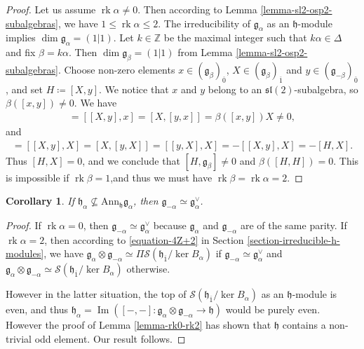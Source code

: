 \documentclass[12pt, a4paper, reqno]{amsart}
\def\g{\mathfrak{g}}
\def\h{\mathfrak{h}}
\def\l{\mathfrak{l}}
\def\s{\mathfrak{s}}
\def\ol{\overline}
\def\rk{\operatorname{rk}}
\newtheorem{corollary}{Corollary}
\theoremstyle{definition}
\theoremstyle{definition}
\theoremstyle{definition}
\numberwithin{theorem}{section}
\numberwithin{lemma}{section}
\numberwithin{remark}{section}
\numberwithin{definition}{section}
\numberwithin{corollary}{section}
\numberwithin{proposition}{section}
\numberwithin{example}{section}
\begin{document}
	\begin{proof}
		Let us assume \(\rk\alpha \neq 0\). Then according to Lemma \ref{lemma-sl2-osp2-subalgebras}, we have \(1 \leq \rk\alpha \leq 2\). The irreducibility of \(\mathfrak{g}_{\alpha}\) as an \(\mathfrak{h}\)-module implies \(\dim \mathfrak{g}_{\alpha} = (1|1)\). Let \(k \in \mathbb{Z}\) be the maximal integer such that \(k\alpha \in \Delta\) and fix \(\beta = k\alpha\). Then \(\dim \mathfrak{g}_\beta = (1|1)\) from Lemma \ref{lemma-sl2-osp2-subalgebras}. Choose non-zero elements \(x \in (\mathfrak{g}_{\beta})_{\ol{0}}\), \(X \in (\mathfrak{g}_{\beta})_{\ol{1}}\) and \(y \in (\mathfrak{g}_{-\beta})_{\ol{0}}\), and set \(H \coloneq [X,y]\). We notice that \(x\) and \(y\) belong to an \(\s\l(2)\)-subalgebra, so \(\beta([x,y]) \neq 0\). We have
		\begin{align*}
			[H,x] = [[X,y],x] = [X,[y,x]] = \beta([x,y])X \neq 0,
		\end{align*}
		and
		\begin{align*}
			[H,X] = [[X,y],X] = [X,[y,X]] = [[y,X],X] = -[[X,y],X] = -[H,X].
		\end{align*}
		Thus \([H,X] = 0\), and we conclude that \([H,\mathfrak{g}_{\beta}] \neq 0\) and \(\beta([H,H]) = 0\). This is impossible if \(\rk\beta = 1\),and thus we must have \(\rk\beta=\rk\alpha = 2\).
	\end{proof}
	\begin{corollary}\label{corollary-twist}
		If \(\mathfrak{h}_{\alpha} \nsubseteq \mathrm{Ann}_{\mathfrak{h}}\mathfrak{g}_{\alpha}\), then \(\mathfrak{g}_{-\alpha} \simeq \mathfrak{g}_{\alpha}^\vee\). 
	\end{corollary}
	\begin{proof}
		If \(\rk\alpha = 0\), then \(\mathfrak{g}_{-\alpha} \simeq \mathfrak{g}_{\alpha}^\vee\) because \(\mathfrak{g}_{\alpha}\) and \(\mathfrak{g}_{-\alpha}\) are of the same parity. If \(\rk\alpha = 2\), then according to \eqref{equation-4Z+2} in Section \ref{section-irreducible-h-modules}, we have \(\mathfrak{g}_{\alpha}\otimes \mathfrak{g}_{-\alpha} \simeq \Pi \mathcal{S}(\mathfrak{h}_{\ol{1}}/\ker B_\alpha)\) if \(\mathfrak{g}_{-\alpha} \simeq \mathfrak{g}_{\alpha}^\vee\) and \(\mathfrak{g}_{\alpha}\otimes \mathfrak{g}_{-\alpha} \simeq \mathcal{S}(\mathfrak{h}_{\ol{1}}/\ker B_\alpha)\) otherwise. 
		
		However in the latter situation, the top of $\mathcal{S}(\mathfrak{h}_{\ol{1}}/\operatorname{ker} B_\alpha)$ as an $\h$-module is even, and thus $\h_{\alpha}=\operatorname{Im}([-,-]:\g_{\alpha}\otimes\g_{-\alpha}\to \h)$ would be purely even.  However the proof of Lemma \ref{lemma-rk0-rk2} has shown that $\h$ contains a non-trivial odd element. Our result follows.
	\end{proof}
	
\end{document}
